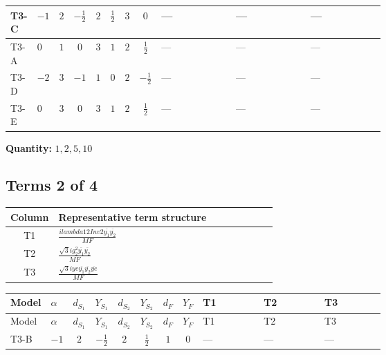 \documentclass[8pt]{article}
\begin{document}
\begin{landscape}
\begin{longtable}{@{}llcccccc >{\raggedright\arraybackslash}p{0.21\linewidth} >{\raggedright\arraybackslash}p{0.21\linewidth} >{\raggedright\arraybackslash}p{0.21\linewidth}@{}}
\midrule
T3-C & $-1$ & $2$ & $-\frac{1}{2}$ & $2$ & $\frac{1}{2}$ & $3$ & $0$ & --- & --- & --- \\
\midrule
T3-A & $0$ & $1$ & $0$ & $3$ & $1$ & $2$ & $\frac{1}{2}$ & --- & --- & --- \\
\midrule
T3-D & $-2$ & $3$ & $-1$ & $1$ & $0$ & $2$ & $-\frac{1}{2}$ & --- & --- & --- \\
\midrule
T3-E & $0$ & $3$ & $0$ & $3$ & $1$ & $2$ & $\frac{1}{2}$ & --- & --- & --- \\
\midrule
\bottomrule
\end{longtable}
\clearpage
\noindent\textbf{Quantity: }$\mathrm{1,2,5,10}$\par\smallskip
\subsection*{Terms 2 of 4}
\begin{center}
\begin{tabular}{@{}c >{\raggedright\arraybackslash}p{0.82\linewidth}@{}}
\toprule
Column & Representative term structure \\
\midrule
T1 & \(\displaystyle \frac{i lambda12Inv2 \overline{y_{1}} \overline{y_{2}}}{MF}\) \\
\midrule
T2 & \(\displaystyle \frac{\sqrt{3} i g_{2}^{2} \overline{y_{1}} \overline{y_{2}}}{MF}\) \\
\midrule
T3 & \(\displaystyle \frac{\sqrt{3} i ye \overline{y_{1}} \overline{y_{2}} \overline{ye}}{MF}\) \\
\midrule
\bottomrule
\end{tabular}
\end{center}
\smallskip
\tiny
\begin{longtable}{@{}llcccccc >{\raggedright\arraybackslash}p{0.21\linewidth} >{\raggedright\arraybackslash}p{0.21\linewidth} >{\raggedright\arraybackslash}p{0.21\linewidth}@{}}
\toprule
Model & $\alpha$ & $d_{S_1}$ & $Y_{S_1}$ & $d_{S_2}$ & $Y_{S_2}$ & $d_F$ & $Y_F$ & T1 & T2 & T3 \\
\midrule
\endfirsthead
\toprule
Model & $\alpha$ & $d_{S_1}$ & $Y_{S_1}$ & $d_{S_2}$ & $Y_{S_2}$ & $d_F$ & $Y_F$ & T1 & T2 & T3 \\
\midrule
\endhead
T3-B & $-1$ & $2$ & $-\frac{1}{2}$ & $2$ & $\frac{1}{2}$ & $1$ & $0$ & --- & --- & --- \\
\midrule

\end{longtable}
\end{landscape}
\end{document}
